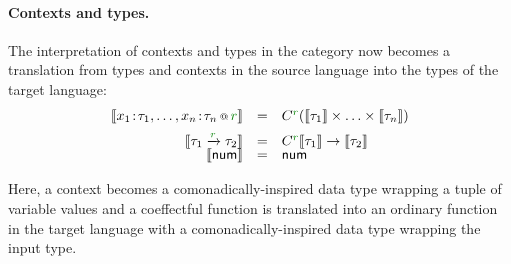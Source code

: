 \paragraph{Contexts and types.}
The interpretation of contexts and types in the category now becomes a translation from types and
contexts in the source language into the types of the target language:
%
\begin{equation*}
\begin{array}{rcl}
\sem{\coctx{x_1\!:\!\tau_1, \ldots, x_n\!:\!\tau_n}{\cclrd{r}}} &=& \ctyp{\cclrd{r}}{(\sem{\tau_1} \times \ldots \times \sem{\tau_n})} \\[0.5em]
\sem{\tau_1 \xrightarrow{\cclrd{r}} \tau_2} & = & \ctyp{\cclrd{r}}{\sem{\tau_1}} \rightarrow \sem{\tau_2} \\[-0.2em]
\sem{\ident{num}} & = & \ident{num} \\
\end{array}
\end{equation*}

\noindent
Here, a context becomes a comonadically-inspired data type wrapping a tuple of variable values 
and a coeffectful function is translated into an ordinary function in the target language
with a comonadically-inspired data type wrapping the input type.


